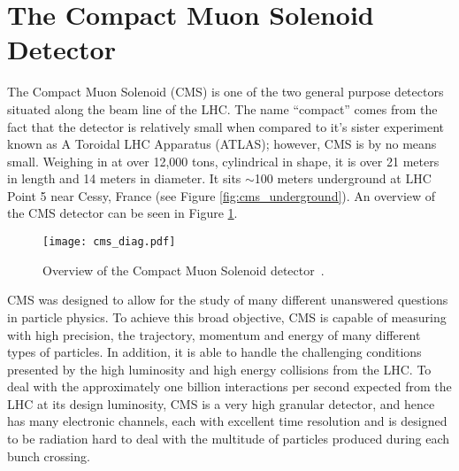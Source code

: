 \section{The Compact Muon Solenoid Detector}
\label {sec:cms_cms}
The Compact Muon Solenoid (CMS) is one of the two general purpose detectors
situated along the beam line of the LHC. The name ``compact'' comes from
the fact that the detector is relatively small when compared to it's
sister experiment known as A Toroidal LHC Apparatus (ATLAS); however, CMS
is by no means small. Weighing in at over 12,000 tons, cylindrical in
shape, it is over 21 meters in length and 14 meters in diameter. It sits
$\sim$100 meters underground at LHC Point 5 near Cessy, France (see Figure
\ref{fig:cms_underground}). An overview of the CMS detector can be seen in
Figure \ref{fig:cms_diag}.
\begin{figure}[tbhp]
\centering
\texttt{[image: cms\_diag.pdf]}
\caption[Overview of the Compact Muon Solenoid detector]
{\label{fig:cms_diag}
Overview of the Compact Muon Solenoid detector~\cite{cmspic}.
}
\end{figure}
CMS was designed to allow for the study of many different unanswered questions
in particle physics. To achieve this broad objective, CMS is capable of
measuring with high precision, the trajectory, momentum and energy of many
different types of particles. In addition, it is able to handle the challenging
conditions presented by the high luminosity and high energy collisions from
the LHC. To deal with the approximately one billion interactions per second
expected from the LHC at its design luminosity, CMS is a very high granular
detector, and hence has many electronic channels, each with excellent time
resolution and is designed to be radiation hard to deal with the multitude of
particles produced during each bunch crossing.

